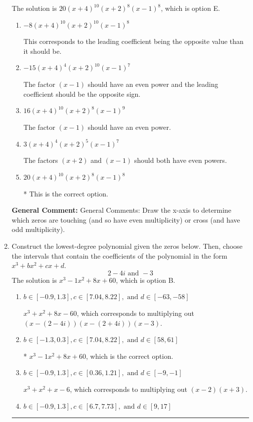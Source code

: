 \documentclass{extbook}[14pt]
\newcommand{\litem}[1]{\item #1

\rule{\textwidth}{0.4pt}}
\begin{document}
\begin{enumerate}
{The solution is \( 20(x + 4)^{10} (x + 2)^{8} (x - 1)^{8} \), which is option E.\begin{enumerate}[label=\Alph*.]
\item \( -8(x + 4)^{10} (x + 2)^{10} (x - 1)^{8} \)

This corresponds to the leading coefficient being the opposite value than it should be.
\item \( -15(x + 4)^{4} (x + 2)^{10} (x - 1)^{7} \)

The factor $(x - 1)$ should have an even power and the leading coefficient should be the opposite sign.
\item \( 16(x + 4)^{10} (x + 2)^{8} (x - 1)^{9} \)

The factor $(x - 1)$ should have an even power.
\item \( 3(x + 4)^{4} (x + 2)^{5} (x - 1)^{7} \)

The factors $(x + 2)$ and $(x - 1)$ should both have even powers.
\item \( 20(x + 4)^{10} (x + 2)^{8} (x - 1)^{8} \)

* This is the correct option.
\end{enumerate}

\textbf{General Comment:} General Comments: Draw the x-axis to determine which zeros are touching (and so have even multiplicity) or cross (and have odd multiplicity).
}
\litem{
Construct the lowest-degree polynomial given the zeros below. Then, choose the intervals that contain the coefficients of the polynomial in the form $x^3+bx^2+cx+d$.
\[ 2 - 4 i \text{ and } -3 \]The solution is \( x^{3} -1 x^{2} +8 x + 60 \), which is option B.\begin{enumerate}[label=\Alph*.]
\item \( b \in [-0.9, 1.3], c \in [7.04, 8.22], \text{ and } d \in [-63, -58] \)

$x^{3} + x^{2} +8 x -60$, which corresponds to multiplying out $(x-(2 - 4 i))(x-(2 + 4 i))(x -3)$.
\item \( b \in [-1.3, 0.3], c \in [7.04, 8.22], \text{ and } d \in [58, 61] \)

* $x^{3} -1 x^{2} +8 x + 60$, which is the correct option.
\item \( b \in [-0.9, 1.3], c \in [0.36, 1.21], \text{ and } d \in [-9, -1] \)

$x^{3} + x^{2} +x -6$, which corresponds to multiplying out $(x -2)(x + 3)$.
\item \( b \in [-0.9, 1.3], c \in [6.7, 7.73], \text{ and } d \in [9, 17] \)


\end{enumerate}}
\end{enumerate}
\end{document}
